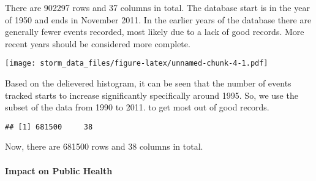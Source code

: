 \documentclass[]{article}
\newenvironment{Shaded}{\begin{snugshade}}{\end{snugshade}}
\newcommand{\KeywordTok}[1]{\textcolor[rgb]{0.13,0.29,0.53}{\textbf{#1}}}
\newcommand{\DataTypeTok}[1]{\textcolor[rgb]{0.13,0.29,0.53}{#1}}
\newcommand{\DecValTok}[1]{\textcolor[rgb]{0.00,0.00,0.81}{#1}}
\newcommand{\StringTok}[1]{\textcolor[rgb]{0.31,0.60,0.02}{#1}}
\newcommand{\ControlFlowTok}[1]{\textcolor[rgb]{0.13,0.29,0.53}{\textbf{#1}}}
\newcommand{\OperatorTok}[1]{\textcolor[rgb]{0.81,0.36,0.00}{\textbf{#1}}}
\newcommand{\NormalTok}[1]{#1}
\let\oldparagraph\paragraph
\renewcommand{\paragraph}[1]{\oldparagraph{#1}\mbox{}}
\begin{document}
There are 902297 rows and 37 columns in total. The database start is in
the year of 1950 and ends in November 2011. In the earlier years of the
database there are generally fewer events recorded, most likely due to a
lack of good records. More recent years should be considered more
complete.

\begin{Shaded}
\end{Shaded}

\texttt{[image: storm\_data\_files/figure-latex/unnamed-chunk-4-1.pdf]}

Based on the delievered histogram, it can be seen that the number of
events tracked starts to increase significantly specifically around
1995. So, we use the subset of the data from 1990 to 2011. to get most
out of good records.

\begin{Shaded}
\end{Shaded}

\begin{verbatim}
## [1] 681500     38
\end{verbatim}

Now, there are 681500 rows and 38 columns in total.

\paragraph{Impact on Public Health}\label{impact-on-public-health}
\end{document}
